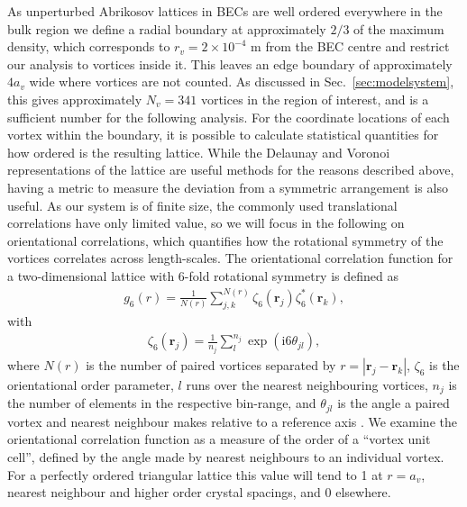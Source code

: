 As unperturbed Abrikosov lattices in BECs are well ordered everywhere in the bulk region \cite{Vtx:Anglin_arxiv_2002} we define a radial boundary at approximately $2/3$ of the maximum density, which corresponds to $r_v=2\times 10^{-4}$ m from the BEC centre and restrict our analysis to vortices inside it. This leaves an edge boundary of approximately $4a_v$ wide where vortices are not counted. As discussed in Sec.~\ref{sec:modelsystem}, this gives approximately $N_v=341$ vortices in the region of interest, and is a sufficient number for the following analysis. For the coordinate locations of each vortex within the boundary, it is possible to calculate statistical quantities for how ordered is the resulting lattice. While the Delaunay and Voronoi representations of the lattice are useful methods for the reasons described above, having a metric to measure the deviation from a symmetric arrangement is also useful. As our system is of finite size, the commonly used translational correlations have only limited value, so we will focus in the following on orientational correlations, which quantifies how the rotational symmetry of the vortices correlates across length-scales. The orientational correlation function for a two-dimensional lattice with 6-fold rotational symmetry is defined as
\begin{align}
	g_6(r) = \frac{1}{N(r)}\displaystyle\sum\limits_{j,k}^{N(r)}\zeta_6(\mathbf{r}_j)\zeta_6^{*}(\mathbf{r}_k),
\end{align}
with
\begin{align}
	\zeta_6(\mathbf{r}_{j}) =  \frac{1}{n_j}\displaystyle\sum\limits_{l}^{n_j}\exp(\mathrm{i}6\theta_{jl}),
\end{align}
where $N(r)$ is the number of paired vortices separated by $r=|\mathbf{r}_j - \mathbf{r}_k|$, $\zeta_6$ is the orientational order parameter, $l$ runs over the nearest neighbouring vortices, $n_j$ is the number of elements in the respective bin-range, and $\theta_{jl}$ is the angle a paired vortex and nearest neighbour makes relative to a reference axis \cite{Guillamon_nat_2014}. We examine the orientational correlation function as a measure of the order of a ``vortex unit cell'', defined by the angle made by nearest neighbours to an individual vortex. For a perfectly ordered triangular lattice this value will tend to 1 at $r=a_v$,  nearest neighbour and higher order crystal spacings, and 0 elsewhere.

